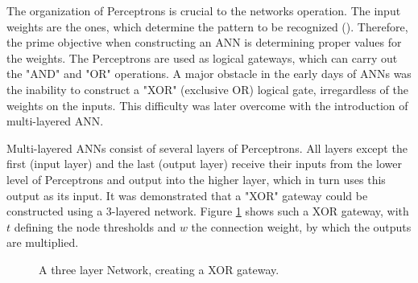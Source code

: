 	The organization of Perceptrons is crucial to the networks operation. The input weights are the ones, which determine the pattern to be recognized (\cite{bishop1995neural}). Therefore, the prime objective when constructing an ANN is determining proper values for the weights. The Perceptrons are used as logical gateways, which can carry out the "AND" and "OR" operations. A major obstacle in the early days of ANNs was the inability to construct  a "XOR" (exclusive OR) logical gate, irregardless of the weights on the inputs. This difficulty was later overcome with the introduction of multi-layered ANN.
	
	Multi-layered ANNs consist of several layers of Perceptrons. All layers except the first (input layer) and the last (output layer) receive their inputs from the lower level of Perceptrons and output into the higher layer, which in turn uses this output as its input. It was demonstrated that a "XOR" gateway could be constructed using a 3-layered network. Figure \ref{ANN_XOR} shows such a XOR gateway, with $ t $ defining the node thresholds and $ w $ the connection weight, by which the outputs are multiplied.
	
	\begin{figure}[h]
		\hspace{0.5cm}
		\captionsetup{width=0.8\textwidth}
		\caption[ANN XOR Perceptron-Network]{
			\footnotesize{
				A three layer Network, creating a XOR gateway.
			}
		} 
		\label{ANN_XOR}
	\end{figure}	
	

